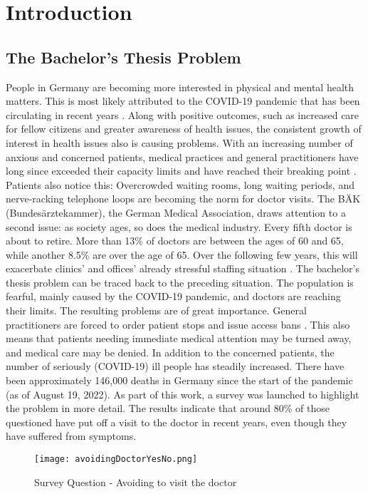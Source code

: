 
\chapter{Introduction}

\section{The Bachelor's Thesis Problem}
People in Germany are becoming more interested in physical and mental health matters. This is most likely attributed to the COVID-19 pandemic that has been circulating in recent years \cite{.bahn-bonn}. Along with positive outcomes, such as increased care for fellow citizens \cite{.bahn-bonn} and greater awareness of health issues, the consistent growth of interest in health issues also is causing problems. With an increasing number of anxious and concerned patients, medical practices and general practitioners have long since exceeded their capacity limits and have reached their breaking point \cite{.sok}. Patients also notice this: Overcrowded waiting rooms, long waiting periods, and nerve-racking telephone loops are becoming the norm for doctor visits. The BÄK (Bundesärztekammer), the German Medical Association, draws attention to a second issue: as society ages, so does the medical industry. Every fifth doctor is about to retire. More than 13\% of doctors are between the ages of 60 and 65, while another 8.5\% are over the age of 65. Over the following few years, this will exacerbate clinics' and offices' already stressful staffing situation \cite{.blatt}. 
The bachelor's thesis problem can be traced back to the preceding situation. The population is fearful, mainly caused by the COVID-19 pandemic, and doctors are reaching their limits. The resulting problems are of great importance. General practitioners are forced to order patient stops and issue access bans \cite{.sok}. This also means that patients needing immediate medical attention may be turned away, and medical care may be denied. In addition to the concerned patients, the number of seriously (COVID-19) ill people has steadily increased. There have been approximately 146,000 deaths in Germany since the start of the pandemic (as of August 19, 2022). \cite{.rki} As part of this work, a survey was launched to highlight the problem in more detail. The results indicate that around 80\% of those questioned have put off a visit to the doctor in recent years, even though they have suffered from symptoms.
\begin{figure}[H]
	\centering
	\texttt{[image: avoidingDoctorYesNo.png]}
	\caption[Survey Question]{Survey Question - Avoiding to visit the doctor}
\end{figure}
